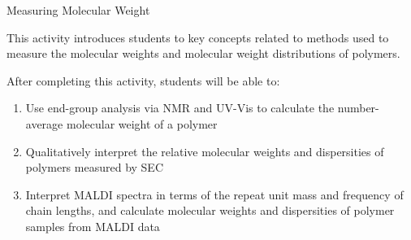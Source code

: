 %
%
%
%

\renewcommand{\figpath}{content/intro/measuring-MW/figs}
\renewcommand{\labelbase}{measuring-MW}

\begin{activity}{Measuring Molecular Weight}
\label{\labelbase}

\begin{instructornotes}

	This activity introduces students to key concepts related to methods used to measure the molecular weights and molecular weight distributions of polymers.
	
	After completing this activity, students will be able to:
			\begin{enumerate}
				\item Use end-group analysis via NMR and UV-Vis to calculate the number-average molecular weight of a polymer
				\item Qualitatively interpret the relative molecular weights and dispersities of polymers measured by SEC
				\item Interpret MALDI spectra in terms of the repeat unit mass and frequency of chain lengths, and calculate molecular weights and dispersities of polymer samples from MALDI data
			\end{enumerate}
			

\end{instructornotes}
\end{activity}
